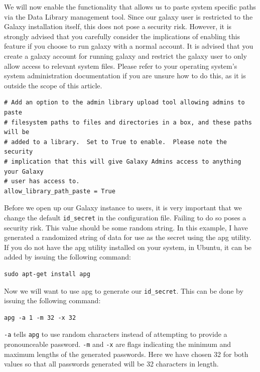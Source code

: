 \documentclass[a4paper,10pt]{article}
\begin{document}
We will now enable the functionality that allows us to paste system specific paths via the Data Library management tool.  Since our galaxy user is restricted to the Galaxy installation itself, this does not pose a security risk.  However, it is strongly advised that you carefully consider the implications of enabling this feature if you choose to run galaxy with a normal account.  It is advised that you create a galaxy account for running galaxy and restrict the galaxy user to only allow access to relevant system files.  Please refer to your operating system's system administration documentation if you are unsure how to do this, as it is outside the scope of this article.

\begin{lstlisting}
# Add an option to the admin library upload tool allowing admins to paste
# filesystem paths to files and directories in a box, and these paths will be
# added to a library.  Set to True to enable.  Please note the security
# implication that this will give Galaxy Admins access to anything your Galaxy
# user has access to.
allow_library_path_paste = True
\end{lstlisting}

Before we open up our Galaxy instance to users, it is very important that we change the default \texttt{\footnotesize{id\_secret}} in the configuration file.  Failing to do so poses a security risk.  This value should be some random string.  In this example, I have generated a randomized string of data for use as the secret using the apg utility.  If you do not have the apg utility installed on your system, in Ubuntu, it can be added by issuing the following command:

\begin{lstlisting}
sudo apt-get install apg
\end{lstlisting}

Now we will want to use apg to generate our \texttt{\footnotesize{id\_secret}}.  This can be done by issuing the following command:

\begin{lstlisting}
apg -a 1 -m 32 -x 32
\end{lstlisting}

\texttt{\footnotesize{-a}} tells \texttt{\footnotesize{apg}} to use random characters instead of attempting to provide a pronounceable password.  \texttt{\footnotesize{-m}} and \texttt{\footnotesize{-x}} are flags indicating the minimum and maximum lengths of the generated passwords.  Here we have chosen 32 for both values so that all passwords generated will be 32 characters in length.
\end{document}
